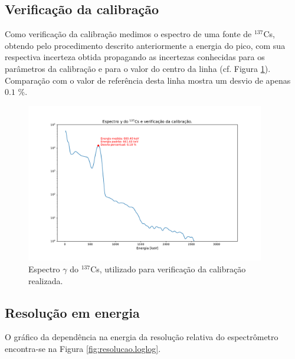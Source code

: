 \documentclass[a4paper, 11pt, notitlepage]{article}
\numberwithin{equation}{section}  %
\begin{document}
\subsection{Verificação da calibração}

Como verificação da calibração medimos o espectro de uma fonte de ${}^{137}$Cs, obtendo pelo procedimento descrito anteriormente a energia do pico, com sua respectiva incerteza obtida propagando as incertezas conhecidas para os parâmetros da calibração e para o valor do centro da linha (cf. Figura \ref{fig:verificacao.calibracao}). Comparação com o valor de referência desta linha mostra um desvio de apenas $0.1$ \%.

\begin{figure}[H]
  \centering
  \includegraphics[width=0.93\textwidth]{verificacao_calibracao.pdf}
  \caption{Espectro $\gamma$ do ${}^{137}$Cs, utilizado para verificação da calibração realizada.}
  \label{fig:verificacao.calibracao}
\end{figure}

\subsection{Resolução em energia}

O gráfico da dependência na energia da resolução relativa do espectrômetro encontra-se na Figura \ref{fig:resolucao.loglog}.
\end{document}
